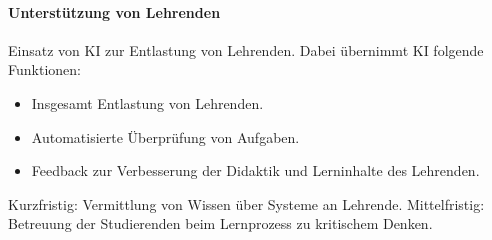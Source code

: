 \paragraph*{Unterstützung von Lehrenden} Einsatz von KI zur Entlastung von Lehrenden. Dabei übernimmt KI folgende Funktionen:
\begin{itemize}
    \item Insgesamt Entlastung von Lehrenden.
    \item Automatisierte Überprüfung von Aufgaben.
    \item Feedback zur Verbesserung der Didaktik und Lerninhalte des Lehrenden.
\end{itemize}
Kurzfristig: Vermittlung von Wissen über Systeme an Lehrende. Mittelfristig: Betreuung der Studierenden beim Lernprozess zu kritischem Denken.